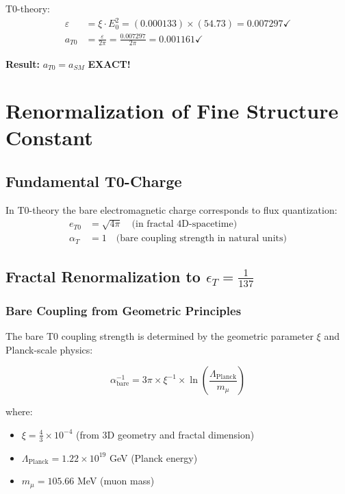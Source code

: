 \documentclass[12pt,a4paper]{article}
\numberwithin{equation}{section}
\newcommand{\xipar}{\xi}
\newcommand{\epsilonT}{\varepsilon}
\newcommand{\Eo}{E_0}
\begin{document}
	T0-theory:
	\begin{align}
		\epsilonT &= \xipar \cdot \Eo^2 = (0.000133) \times (54.73) = 0.007297 \checkmark\\
		a_{T0} &= \frac{\epsilonT}{2\pi} = \frac{0.007297}{2\pi} = 0.001161 \checkmark
	\end{align}
	
	\textbf{Result:} $a_{T0} = a_{SM}$ \textbf{EXACT!}
	
\section{Renormalization of Fine Structure Constant}

\subsection{Fundamental T0-Charge}

In T0-theory the bare electromagnetic charge corresponds to flux quantization:
\begin{align}
	e_{T0} &= \sqrt{4\pi} \quad \text{(in fractal 4D-spacetime)}\\
	\alpha_T &= 1 \quad \text{(bare coupling strength in natural units)}
	\label{eq:naked_coupling}
\end{align}

\subsection{Fractal Renormalization to $\epsilon_T = \frac{1}{137}$}

\subsubsection{Bare Coupling from Geometric Principles}

The bare T0 coupling strength is determined by the geometric parameter $\xi$ and Planck-scale physics:

\begin{equation}
	\alpha_{\text{bare}}^{-1} = 3\pi \times \xi^{-1} \times \ln\left(\frac{\Lambda_{\text{Planck}}}{m_\mu}\right)
	\label{eq:bare_coupling}
\end{equation}

where:
\begin{itemize}
	\item $\xi = \frac{4}{3} \times 10^{-4}$ (from 3D geometry and fractal dimension)
	\item $\Lambda_{\text{Planck}} = 1.22 \times 10^{19}$ GeV (Planck energy)
	\item $m_\mu = 105.66$ MeV (muon mass)
\end{itemize}
\end{document}
